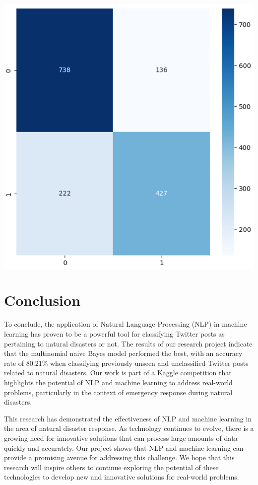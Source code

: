 \documentclass[11pt]{diazessay} %
\begin{document}
\begin{minipage}[b]{.45\linewidth}
\includegraphics[width=\linewidth]{images/mlp_heatmap.png}
\end{minipage}\hfill


\section*{Conclusion}

To conclude, the application of Natural Language Processing (NLP) in machine learning has proven to be a powerful tool for classifying Twitter posts as pertaining to natural disasters or not. The results of our research project indicate that the multinomial naive Bayes model performed the best, with an accuracy rate of 80.21\% when classifying previously unseen and unclassified Twitter posts related to natural disasters. Our work is part of a Kaggle competition that highlights the potential of NLP and machine learning to address real-world problems, particularly in the context of emergency response during natural disasters.

This research has demonstrated the effectiveness of NLP and machine learning in the area of natural disaster response. As technology continues to evolve, there is a growing need for innovative solutions that can process large amounts of data quickly and accurately. Our project shows that NLP and machine learning can provide a promising avenue for addressing this challenge. We hope that this research will inspire others to continue exploring the potential of these technologies to develop new and innovative solutions for real-world problems.
\end{document}
